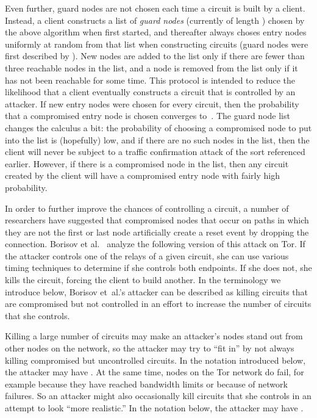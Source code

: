 \documentclass[]{lmcs}
\let\citeN\citet
\begin{document}
Even further, guard nodes are not chosen each time a circuit is built
by a client.  Instead, a client constructs a list
of \emph{guard nodes} (currently of length ) 
chosen by the above algorithm when first started,
and thereafter always choses entry nodes uniformly at random
from that list when constructing circuits (guard nodes were
first described by \citeN{wright-sosp2003}).
New nodes are added to the list only if there are fewer than three
reachable nodes in the list, and a node is removed from the list only
if it has not been reachable for some time.
This protocol is intended to reduce the likelihood that a 
client eventually constructs a circuit that is controlled by an
attacker.  If new entry nodes were chosen for every circuit, then the
probability that a compromised entry node is chosen
converges to~.  
The guard node list changes the calculus a bit:  the probability
of choosing a compromised node to put into the list is (hopefully)
low, and
if there are no such nodes in the list, then the client
will never be subject to a traffic confirmation attack of the sort
referenced earlier.
However, if there is a compromised node in the list, then
any circuit created by the client will have a compromised
entry node with fairly high probability.


In order to further improve the chances of controlling
a circuit, a number of researchers 
\cite{syverson-ieee06,low-resource-weps07,ccs07-doa}
have suggested that compromised nodes that occur on paths in which they
are not the first or last node artificially create a reset event 
by dropping the connection.  
Borisov et al.~\citeyearpar{ccs07-doa} analyze the following version
of this attack on Tor.  If the attacker controls one of the relays
of a given circuit, she can use various timing techniques to determine
if she controls both endpoints.  If she does not, she kills the circuit,
forcing the client to build another.
In the terminology we introduce below, 
Borisov et~al.'s attacker can be described
as killing circuits that are compromised but not controlled in an
effort to increase the number of circuits that she controls.

Killing a large number of circuits may make an attacker's nodes stand
out from other nodes on the network, so the attacker may try to
``fit in'' by not always killing
compromised but uncontrolled circuits.  In the notation introduced
below, the attacker may have .  At the same time,
nodes on the Tor network do fail, for example because they have reached
bandwidth limits or because of network failures.  So an attacker might
also occasionally kill circuits that she controls in an attempt to
look ``more realistic.''  In the notation below, the attacker
may have .
\end{document}
